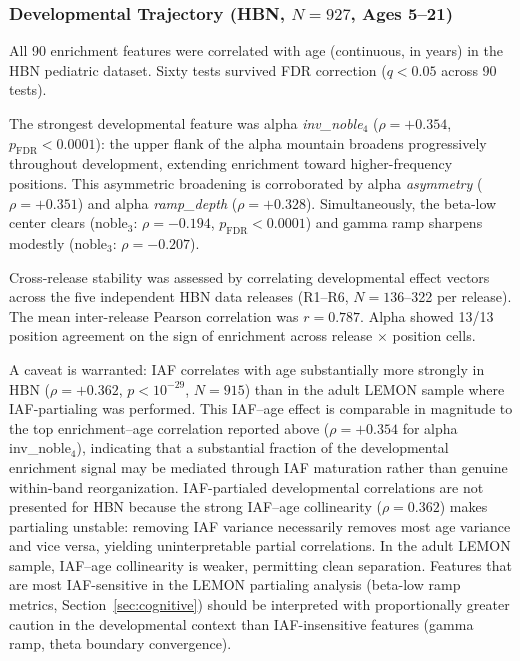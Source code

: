 \subsubsection{Developmental Trajectory (HBN, $N = 927$, Ages 5--21)}
\label{sec:development}

All 90 enrichment features were correlated with age (continuous, in years) in the HBN pediatric dataset. Sixty tests survived FDR correction ($q < 0.05$ across 90 tests).

The strongest developmental feature was alpha \textit{inv\_noble$_4$} ($\rho = +0.354$, $p_\text{FDR} < 0.0001$): the upper flank of the alpha mountain broadens progressively throughout development, extending enrichment toward higher-frequency positions. This asymmetric broadening is corroborated by alpha \textit{asymmetry} ($\rho = +0.351$) and alpha \textit{ramp\_depth} ($\rho = +0.328$). Simultaneously, the beta-low center clears (noble$_3$: $\rho = -0.194$, $p_\text{FDR} < 0.0001$) and gamma ramp sharpens modestly (noble$_3$: $\rho = -0.207$).

Cross-release stability was assessed by correlating developmental effect vectors across the five independent HBN data releases (R1--R6, $N = 136$--322 per release). The mean inter-release Pearson correlation was $r = 0.787$. Alpha showed 13/13 position agreement on the sign of enrichment across release $\times$ position cells.

A caveat is warranted: IAF correlates with age substantially more strongly in HBN ($\rho = +0.362$, $p < 10^{-29}$, $N = 915$) than in the adult LEMON sample where IAF-partialing was performed. This IAF--age effect is comparable in magnitude to the top enrichment--age correlation reported above ($\rho = +0.354$ for alpha inv\_noble$_4$), indicating that a substantial fraction of the developmental enrichment signal may be mediated through IAF maturation rather than genuine within-band reorganization. IAF-partialed developmental correlations are not presented for HBN because the strong IAF--age collinearity ($\rho = 0.362$) makes partialing unstable: removing IAF variance necessarily removes most age variance and vice versa, yielding uninterpretable partial correlations. In the adult LEMON sample, IAF--age collinearity is weaker, permitting clean separation. Features that are most IAF-sensitive in the LEMON partialing analysis (beta-low ramp metrics, Section~\ref{sec:cognitive}) should be interpreted with proportionally greater caution in the developmental context than IAF-insensitive features (gamma ramp, theta boundary convergence).

